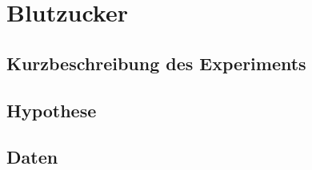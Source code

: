 \section{Blutzucker}

\subsection{Kurzbeschreibung des Experiments}

\subsection{Hypothese}

\subsection{Daten}

